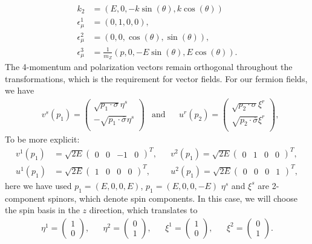 \documentclass{report}
\newcommand{\nn}{\nonumber}
\numberwithin{equation}{section}
\begin{document}
\begin{align}\label{aa}
k_2&=(E,0,-k \sin(\theta),k \cos(\theta))\nn\\
\epsilon^1_\mu&=(0,1,0,0),\nn\\
\epsilon^2_\mu&=(0,0,\cos(\theta),\sin(\theta)),\nn\\
\epsilon^3_\mu&=\frac{1}{m_Z}(p,0,-E\sin(\theta),E \cos(\theta)).
\end{align}
The 4-momentum and polarization vectors remain orthogonal throughout the transformations, which is the requirement for vector fields.
For our fermion fields, we have
\begin{align}
&v^s(p_1)=\begin{pmatrix}
\sqrt{p_1\cdot \sigma}\eta^s\\
-\sqrt{p_1\cdot \overline{\sigma}}\eta^s\\
\end{pmatrix} &\text{and} &&u^r(p_2)=\begin{pmatrix}
\sqrt{p_2\cdot \sigma}\xi^r \\
\sqrt{p_2\cdot \overline{\sigma}}\xi^r\\
\end{pmatrix},
\end{align}
To be more explicit:
\begin{align}
v^1(p_1)&=\sqrt{2E}\begin{pmatrix}
0&0&-1&0
\end{pmatrix}^T,
&&v^2(p_1)=\sqrt{2E}\begin{pmatrix}
0&1&0&0
\end{pmatrix}^T,\nn\\
u^1(p_1)&=\sqrt{2E}\begin{pmatrix}
1&0&0&0
\end{pmatrix}^T,
&&u^2(p_1)=\sqrt{2E}\begin{pmatrix}
0&0&0&1
\end{pmatrix}^T,
\end{align}
here we have used $p_1=(E,0,0,E)$, $p_1=(E,0,0,-E)$ $\eta^s$ and $\xi^s$ are 2-component spinors, which denote spin components. In this case, we will choose the spin basis in the $z$ direction, which translates to
\begin{align}
\eta^1=\begin{pmatrix}
1\\0
\end{pmatrix},&&\eta^2=\begin{pmatrix}
0\\1
\end{pmatrix},&&\xi^1=\begin{pmatrix}
1\\0
\end{pmatrix},&&\xi^2=\begin{pmatrix}
0\\1
\end{pmatrix}.
\end{align}
\end{document}
